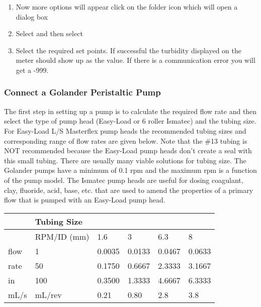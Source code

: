 \documentclass[letterpaper,10pt,english]{sphinxmanual}
\begin{document}
\begin{enumerate}
\item {} 
Now more options will appear click on the folder icon which will open a dialog box

\item {} 
Select  and then select 

\item {} 
Select the required set points.  If successful the turbidity displayed on the meter should show up as the value. If there is a communication error you will get a -999.

\end{enumerate}


\subsubsection{Connect a Golander Peristaltic Pump}
\label{\detokenize{ProCoDA/ProCoDA:connect-a-golander-peristaltic-pump}}\label{\detokenize{ProCoDA/ProCoDA:heading-procoda-golander-peristaltic-pump}}
The first step in setting up a pump is to calculate the required flow rate and then select the type of pump head (Easy-Load or 6 roller Ismatec) and the tubing size. For Easy-Load L/S Masterflex pump heads the recommended tubing sizes and corresponding range of flow rates are given below. Note that the \#13 tubing is NOT recommended because the Easy-Load pump heads don’t create a seal with this small tubing. There are usually many viable solutions for tubing size. The Golander pumps have a minimum of 0.1 rpm and the maximum rpm is a function of the pump model.
The Ismatec pump heads are useful for dosing coagulant, clay, fluoride, acid, base, etc. that are used to amend the properties of a primary flow that is pumped with an Easy-Load pump head.


\begin{savenotes}\sphinxattablestart
\centering
{}
\label{\detokenize{ProCoDA/ProCoDA:id12}}\label{\detokenize{ProCoDA/ProCoDA:table-procoda-pump-tubing}}
\sphinxaftercaption
\begin{tabulary}{\linewidth}[t]{|T|T|T|T|T|T|}
\hline
\sphinxstyletheadfamily &\sphinxstyletheadfamily 
Tubing Size
&
&
&
&
\\
\hline&
RPM/ID (mm)
&
1.6
&
3
&
6.3
&
8
\\
\hline
flow
&
1
&
0.0035
&
0.0133
&
0.0467
&
0.0633
\\
\hline
rate
&
50
&
0.1750
&
0.6667
&
2.3333
&
3.1667
\\
\hline
in
&
100
&
0.3500
&
1.3333
&
4.6667
&
6.3333
\\
\hline
mL/s
&
mL/rev
&
0.21
&
0.80
&
2.8
&
3.8
\\
\hline
\end{tabulary}
\par
\sphinxattableend\end{savenotes}
\end{document}
